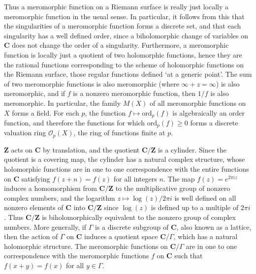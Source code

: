 Thus a meromorphic function on a Riemann surface is really just locally a meromorphic function in the usual sense. In particular, it follows from this that the singularities of a meromorphic function forms a discrete set, and that each singularity has a well defined order, since a biholomorphic change of variables on $\mathbf{C}$ does not change the order of a singularity. Furthermore, a meromorphic function is locally just a quotient of two holomorphic functions, hence they are the rational functions corresponding to the scheme of holomorphic functions on the Riemann surface, those regular functions defined `at a generic point'. The sum of two meromorphic functions is also meromorphic (where $\infty + z = \infty$) is also meromorphic, and if $f$ is a nonzero meromorphic function, then $1/f$ is also meromorphic. In particular, the family $M(X)$ of all meromorphic functions on $X$ forms a field. For each $p$, the function $f \mapsto \text{ord}_p(f)$ is algebraically an order function, and therefore the functions for which $\text{ord}_p(f) \geq 0$ forms a discrete valuation ring $\mathcal{O}_p(X)$, the ring of functions finite at $p$.

\begin{example}
    $\mathbf{Z}$ acts on $\mathbf{C}$ by translation, and the quotient $\mathbf{C}/\mathbf{Z}$ is a cylinder. Since the quotient is a covering map, the cylinder has a natural complex structure, whose holomorphic functions are in one to one correspondence with the entire functions on $\mathbf{C}$ satisfying $f(z + n) = f(z)$ for all integers $n$. The map $f(z) = e^{2 \pi i z}$ induces a homomorphism from $\mathbf{C}/\mathbf{Z}$ to the multiplicative group of nonzero complex numbers, and the logarithm $z \mapsto \log(z)/2\pi i$ is well defined on all nonzero elements of $\mathbf{C}$ into $\mathbf{C}/\mathbf{Z}$ since $\log(z)$ is defined up to a multiple of $2 \pi i$. Thus $\mathbf{C}/\mathbf{Z}$ is biholomorphically equivalent to the nonzero group of complex numbers. More generally, if $\Gamma$ is a discrete subgroup of $\mathbf{C}$, also known as a lattice, then the action of $\Gamma$ on $\mathbf{C}$ induces a quotient space $\mathbf{C}/\Gamma$, which has a natural holomorphic structure. The meromorphic functions on $\mathbf{C}/\Gamma$ are in one to one correspondence with the meromorphic functions $f$ on $\mathbf{C}$ such that $f(x + y) = f(x)$ for all $y \in \Gamma$.
\end{example}

